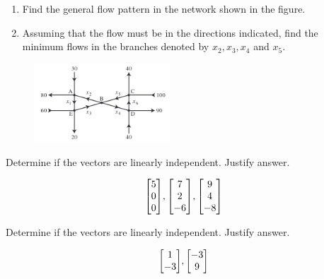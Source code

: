 \documentclass{../mathhomework}
\newenvironment{Mat}{\begin{bmatrix}}{\end{bmatrix}}
\begin{document}
\begin{problem}[1.6\#13]
    \begin{enumerate}[label=\alph*.]
        \item Find the general flow pattern in the network shown in the figure.
        \item Assuming that the flow must be in the directions indicated, find the minimum flows in the branches denoted by $x_2,x_3,x_4$ and $x_5$.
    \end{enumerate}

    \begin{figure}[h!]
        \begin{center}
            \includegraphics[width=2in]{figures/1_6_13.png}
        \end{center}
    \end{figure}
\end{problem}

\begin{problem}[1.7\#1]
    Determine if the vectors are linearly independent. Justify answer.
    
    \begin{equation*}
        \begin{Mat}
            5 \\ 0 \\ 0
        \end{Mat},
        \begin{Mat}
            7 \\ 2 \\ -6
        \end{Mat},
        \begin{Mat}
            9 \\ 4 \\ -8
        \end{Mat}
    \end{equation*}
\end{problem}

\begin{problem}[1.7\#3]
    Determine if the vectors are linearly independent. Justify answer.
    
    \begin{equation*}
        \begin{Mat}
            1 \\ -3
        \end{Mat},
        \begin{Mat}
            -3 \\ 9
        \end{Mat}
    \end{equation*}
\end{problem}
\end{document}
